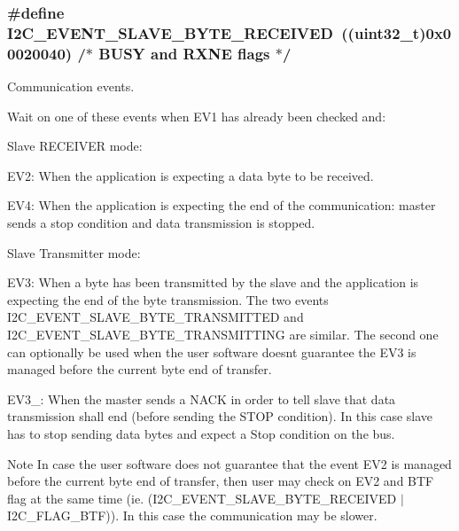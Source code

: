\subsubsection[{\texorpdfstring{I2\+C\+\_\+\+E\+V\+E\+N\+T\+\_\+\+S\+L\+A\+V\+E\+\_\+\+B\+Y\+T\+E\+\_\+\+R\+E\+C\+E\+I\+V\+ED}{I2C_EVENT_SLAVE_BYTE_RECEIVED}}]{\setlength{\rightskip}{0pt plus 5cm}\#define I2\+C\+\_\+\+E\+V\+E\+N\+T\+\_\+\+S\+L\+A\+V\+E\+\_\+\+B\+Y\+T\+E\+\_\+\+R\+E\+C\+E\+I\+V\+ED~(({\bf uint32\+\_\+t})0x00020040)  /$\ast$ B\+U\+S\+Y and R\+X\+N\+E flags $\ast$/}\hypertarget{group___i2_c___events_ga8b244626839940569c6c8bbfc4efe21d}{}\label{group___i2_c___events_ga8b244626839940569c6c8bbfc4efe21d}


Communication events. 

Wait on one of these events when E\+V1 has already been checked and\+:


\begin{DoxyItemize}
\item Slave R\+E\+C\+E\+I\+V\+ER mode\+:
\begin{DoxyItemize}
\item E\+V2\+: When the application is expecting a data byte to be received.
\item E\+V4\+: When the application is expecting the end of the communication\+: master sends a stop condition and data transmission is stopped.
\end{DoxyItemize}
\item Slave Transmitter mode\+:
\begin{DoxyItemize}
\item E\+V3\+: When a byte has been transmitted by the slave and the application is expecting the end of the byte transmission. The two events I2\+C\+\_\+\+E\+V\+E\+N\+T\+\_\+\+S\+L\+A\+V\+E\+\_\+\+B\+Y\+T\+E\+\_\+\+T\+R\+A\+N\+S\+M\+I\+T\+T\+ED and I2\+C\+\_\+\+E\+V\+E\+N\+T\+\_\+\+S\+L\+A\+V\+E\+\_\+\+B\+Y\+T\+E\+\_\+\+T\+R\+A\+N\+S\+M\+I\+T\+T\+I\+NG are similar. The second one can optionally be used when the user software doesn\textquotesingle{}t guarantee the E\+V3 is managed before the current byte end of transfer.
\item E\+V3\+\_\+: When the master sends a N\+A\+CK in order to tell slave that data transmission shall end (before sending the S\+T\+OP condition). In this case slave has to stop sending data bytes and expect a Stop condition on the bus.
\end{DoxyItemize}

\begin{DoxyNote}{Note}
In case the user software does not guarantee that the event E\+V2 is managed before the current byte end of transfer, then user may check on E\+V2 and B\+TF flag at the same time (ie. (I2\+C\+\_\+\+E\+V\+E\+N\+T\+\_\+\+S\+L\+A\+V\+E\+\_\+\+B\+Y\+T\+E\+\_\+\+R\+E\+C\+E\+I\+V\+ED $\vert$ I2\+C\+\_\+\+F\+L\+A\+G\+\_\+\+B\+TF)). In this case the communication may be slower. 
\end{DoxyNote}

\end{DoxyItemize}

